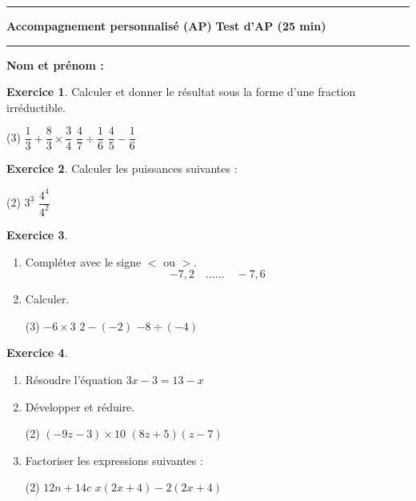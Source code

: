 \documentclass{article}
\theoremstyle{definition}
\newtheorem{exercice}{Exercice}
\begin{document}
\hrule

\vfill
\setcounter{exercice}{0}
{
  \normalsize
  \textbf{\Niveau} \hfill \textbf{Accompagnement personnalisé (AP)} \hfill \textbf{Test d'AP (25 min)}
}
\hrule
\vfill
\textbf{Nom et prénom :}\enspace\dotfill

\begin{exercice}{}{}
Calculer et donner le résultat sous la forme d'une fraction irréductible.
\begin{tasks}(3)
  \task $\dfrac{1}{3} + \dfrac{8}{3} \times \dfrac{3}{4}$
  \task $\dfrac{4}{7}\div\dfrac{1}{6}$
  \task $\dfrac{4}{5}-\dfrac{1}{6}$
\end{tasks}
\end{exercice}

\begin{exercice}{}{}
  Calculer les puissances suivantes :
 \begin{tasks}(2)
  \task $3^3$
  \task $\dfrac{4^{4}}{4^{2}}$%
 \end{tasks}
\end{exercice}


\begin{exercice}{}{}
  \begin{enumerate}
    \item Compléter avec le signe $<$ ou $>$.
  $$ -7,2 \quad \ldots\ldots   \quad-7,6 $$
  
    \item Calculer.


    \begin{tasks}(3)
      \task $ -6  \times 3$
      \task $ 2 - (-2)$
      \task $ -8 \div (-4)$
    \end{tasks}

  \end{enumerate}
\end{exercice}

\begin{exercice}{}{}
  \begin{enumerate}
    \item Résoudre l'équation $3x - 3 = 13 - x$
    \item Développer et réduire.
    \begin{tasks}(2)
      \task $(-9z - 3) \times 10$
      \task $(8z + 5) (z - 7)$
    \end{tasks}
    \item Factoriser les expressions suivantes :
    \begin{tasks}(2)
      \task $12n  + 14c$
      \task $x(2x + 4) - 2(2x + 4)$
    \end{tasks}
  \end{enumerate}
\end{exercice}

\vfill
\end{document}
